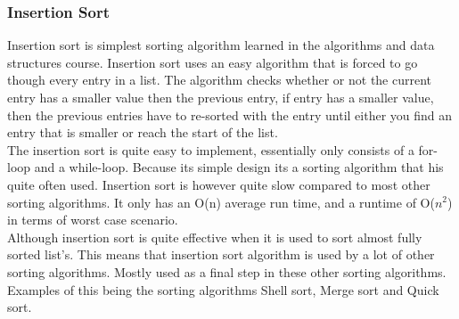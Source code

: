 \subsubsection{Insertion Sort}
Insertion sort is simplest sorting algorithm learned in the algorithms and data structures course. Insertion sort uses an easy algorithm that is forced to go though every entry in a list. The algorithm checks whether or not the current entry has a smaller value then the previous entry, if entry has a smaller value, then the previous entries have to re-sorted with the entry until either you find an entry that is smaller or reach the start of the list. 
\\The insertion sort is quite easy to implement, essentially only consists of a for-loop and a while-loop. Because its simple design its a sorting algorithm that his quite often used. Insertion sort is however quite slow compared to most other sorting algorithms. It only has an O(n) average run time, and a runtime of O($n^2$) in terms of worst case scenario.
\\Although insertion sort is quite effective when it is used to sort almost fully sorted list's. This means that insertion sort algorithm is used by a lot of other sorting algorithms. Mostly used as a final step in these other sorting algorithms. Examples of this being the sorting algorithms Shell sort, Merge sort and Quick sort.	%
